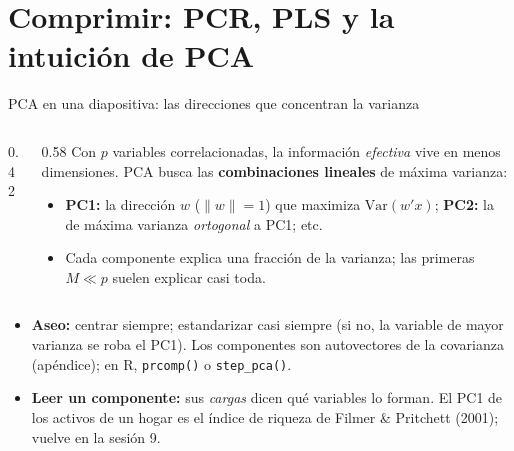 \documentclass{beamer}
\newcommand{\Var}{\mathrm{Var}}
\newcommand{\1}{\mathbb{I}}
\begin{document}
\section{Comprimir: PCR, PLS y la intuición de PCA}
\begin{frame}[noframenumbering]
\tableofcontents[currentsection]
\end{frame}

\begin{frame}{PCA en una diapositiva: las direcciones que concentran la varianza}
\small
\begin{columns}[T]
\begin{column}{0.42\textwidth}
\begin{center}
\end{center}
\end{column}
\begin{column}{0.58\textwidth}
\vspace{0.05cm}
Con $p$ variables correlacionadas, la información \emph{efectiva} vive en menos dimensiones. PCA busca las \textbf{combinaciones lineales} de máxima varianza:
\begin{itemize}\itemsep3pt
  \item \textbf{PC1:} la dirección $w$ ($\|w\| = 1$) que maximiza $\Var(w'x)$; \textbf{PC2:} la de máxima varianza \emph{ortogonal} a PC1; etc.
  \item Cada componente explica una fracción de la varianza; las primeras $M \ll p$ suelen explicar casi toda.
\end{itemize}
\end{column}
\end{columns}
\pause
\begin{itemize}\itemsep3pt
  \item \textbf{Aseo:} centrar siempre; estandarizar casi siempre (si no, la variable de mayor varianza se roba el PC1). Los componentes son autovectores de la covarianza (apéndice); en R, \texttt{prcomp()} o \texttt{step\_pca()}.
  \item \textbf{Leer un componente:} sus \emph{cargas} dicen qué variables lo forman. El PC1 de los activos de un hogar es el índice de riqueza de Filmer \& Pritchett (2001); vuelve en la sesión 9.
\end{itemize}
\end{frame}
\end{document}
